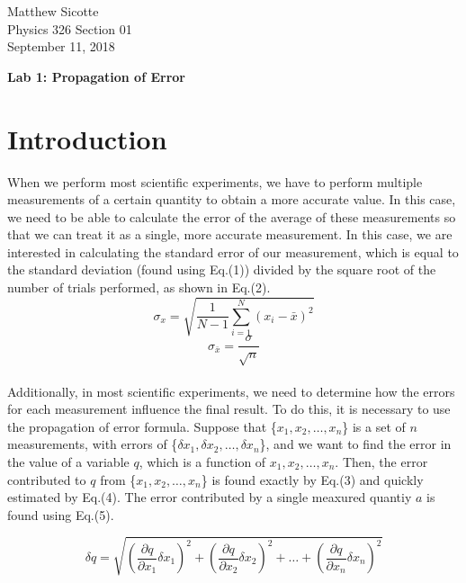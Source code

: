 \documentclass[leqno]{article}
\begin{document}
\begin{flushright}
Matthew Sicotte\\
Physics 326 Section 01\\
September 11, 2018
\end{flushright}
\begin{center}
	{\large \bf Lab 1: Propagation of Error}
\end{center}
\section*{Introduction}
When we perform most scientific experiments, we have to perform multiple measurements of a certain quantity to obtain a more accurate value.  In this case, we need to be able to calculate the error of the average of these measurements so that we can treat it as a single, more accurate measurement.  In this case, we are interested in calculating the standard error of our measurement, which is equal to the standard deviation (found using Eq.(1)) divided by the square root of the number of trials performed, as shown in Eq.(2).  
\begin{equation}
	\sigma_x=\sqrt{\frac{1}{N-1}\sum_{i=1}^{N} (x_i-\bar{x})^2}
\end{equation}
\begin{equation}
	\sigma_{\bar{x}}=\frac{\sigma}{\sqrt{n}}
\end{equation}\\

Additionally, in most scientific experiments, we need to determine how the errors for each measurement influence the final result.  To do this, it is necessary to use the propagation of error formula.  Suppose that \{$x_1, x_2, \ldots, x_n$\} is a set of $n$ measurements, with errors of \{$\delta x_1, \delta x_2, \ldots, \delta x_n$\}, and we want to find the error in the value of a variable $q$, which is a function of $x_1, x_2, \ldots, x_n$.  Then, the error contributed to $q$ from \{$x_1, x_2, \ldots, x_n$\} is found exactly by Eq.(3) and quickly estimated by Eq.(4).  The error contributed by a single meaxured quantiy $a$ is found using Eq.(5). 


\begin{equation}
	\delta q=\sqrt{(\frac{\partial q}{\partial x_1}\delta x_1)^2+(\frac{\partial q}{\partial x_2}\delta x_2)^2+\ldots+(\frac{\partial q}{\partial x_n}\delta x_n)^2}
\end{equation}
\end{document}
